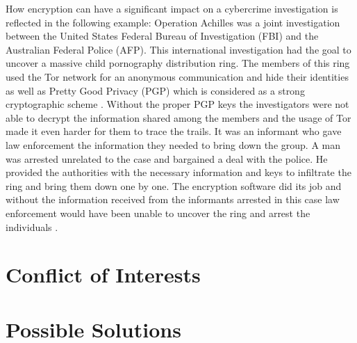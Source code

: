 \documentclass[a4paper, 11pt]{article}
\begin{document}
\par How encryption can have a significant impact on a cybercrime investigation is reflected in the following example: Operation Achilles was a joint investigation between the United States Federal Bureau of Investigation (FBI) and the Australian Federal Police (AFP). This international investigation had the goal to uncover a massive child pornography distribution ring. The members of this ring used the Tor network for an anonymous communication and hide their identities as well as Pretty Good Privacy (PGP) which is considered as a strong cryptographic scheme \cite{STRONGCRYPTO}. Without the proper PGP keys the investigators were not able to decrypt the information shared among the members and the usage of Tor made it even harder for them to trace the trails. It was an informant who gave law enforcement the information they needed to bring down the group. A man was arrested unrelated to the case and bargained a deal with the police. He provided the authorities with the necessary information and keys to infiltrate the ring and bring them down one by one. The encryption software did its job and without the information received from the informants arrested in this case law enforcement would have been unable to uncover the ring and arrest the individuals \cite{ACHILLES} \cite{FBIACHILLES}.

\section*{Conflict of Interests}

\section*{Possible Solutions}
\end{document}
